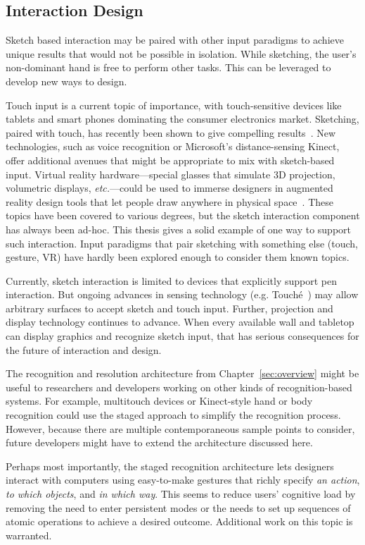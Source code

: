 \subsection{Interaction Design}

Sketch based interaction may be paired with other input paradigms to
achieve unique results that would not be possible in isolation. While
sketching, the user's non-dominant hand is free to perform other
tasks. This can be leveraged to develop new ways to design. 

Touch input is a current topic of importance, with touch-sensitive
devices like tablets and smart phones dominating the consumer
electronics market. Sketching, paired with touch, has recently been
shown to give compelling results~\cite{hinckley-pen-touch}. New
technologies, such as voice recognition or Microsoft's
distance-sensing Kinect, offer additional avenues that might be
appropriate to mix with sketch-based input. Virtual reality
hardware---special glasses that simulate 3D projection, volumetric
displays, \textit{etc.}---could be used to immerse designers in
augmented reality design tools that let people draw anywhere in
physical space~\cite{jung-lightpen}. These topics have been covered to
various degrees, but the sketch interaction component has always been
ad-hoc. This thesis gives a solid example of one way to support such
interaction. Input paradigms that pair sketching with something else
(touch, gesture, VR) have hardly been explored enough to consider them
known topics.

Currently, sketch interaction is limited to devices that explicitly
support pen interaction. But ongoing advances in sensing technology
(e.g. Touch\'e~\cite{sato-touche}) may allow arbitrary surfaces to
accept sketch and touch input. Further, projection and display
technology continues to advance. When every available wall and
tabletop can display graphics and recognize sketch input, that has
serious consequences for the future of interaction and design.

The recognition and resolution architecture from
Chapter~\ref{sec:overview} might be useful to researchers and
developers working on other kinds of recognition-based systems. For
example, multitouch devices or Kinect-style hand or body recognition
could use the staged approach to simplify the recognition
process. However, because there are multiple contemporaneous sample
points to consider, future developers might have to extend the
architecture discussed here.

Perhaps most importantly, the staged recognition architecture lets
designers interact with computers using easy-to-make gestures that
richly specify \textit{an action}, \textit{to which objects}, and
\textit{in which way}. This seems to reduce users' cognitive load by
removing the need to enter persistent modes or the needs to set up
sequences of atomic operations to achieve a desired
outcome. Additional work on this topic is warranted.

